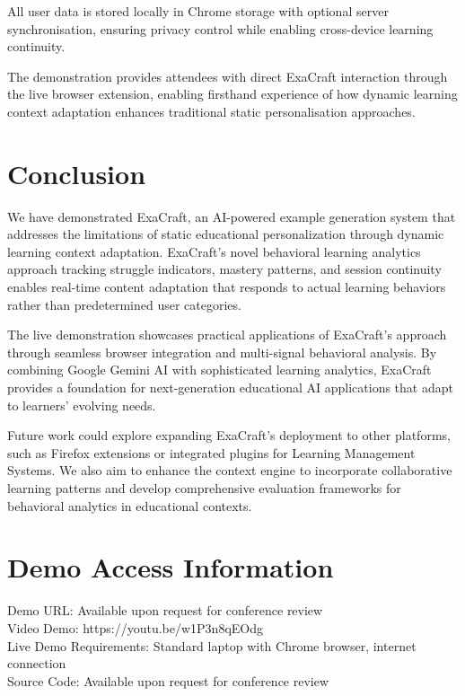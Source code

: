 \documentclass[sigconf]{acmart}
\begin{document}
All user data is stored locally in Chrome storage with optional server synchronisation, ensuring privacy control while enabling cross-device learning continuity. 

The demonstration provides attendees with direct ExaCraft interaction through the live browser extension, enabling firsthand experience of how dynamic learning context adaptation enhances traditional static personalisation approaches.

\section{Conclusion}

We have demonstrated ExaCraft, an AI-powered example generation system that addresses the limitations of static educational personalization through dynamic learning context adaptation. ExaCraft's novel behavioral learning analytics approach tracking struggle indicators, mastery patterns, and session continuity enables real-time content adaptation that responds to actual learning behaviors rather than predetermined user categories.

The live demonstration showcases practical applications of ExaCraft's approach through seamless browser integration and multi-signal behavioral analysis. By combining Google Gemini AI with sophisticated learning analytics, ExaCraft provides a foundation for next-generation educational AI applications that adapt to learners' evolving needs.

Future work could explore expanding ExaCraft's deployment to other platforms, such as Firefox extensions or integrated plugins for Learning Management Systems. We also aim to enhance the context engine to incorporate collaborative learning patterns and develop comprehensive evaluation frameworks for behavioral analytics in educational contexts.

\section{Demo Access Information}

Demo URL: Available upon request for conference review\\
Video Demo: https://youtu.be/w1P3n8qEOdg\\
Live Demo Requirements: Standard laptop with Chrome browser, internet connection\\
Source Code: Available upon request for conference review



\end{document}
